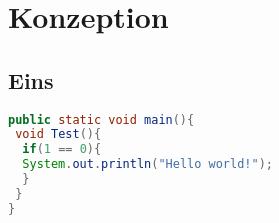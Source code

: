 \chapter{Konzeption}
\minitoc
\section{Eins}
\begin{lstlisting}[language=java]
public static void main(){
 void Test(){
  if(1 == 0){
  System.out.println("Hello world!");
  }
 }
}
\end{lstlisting}
\lipsum
